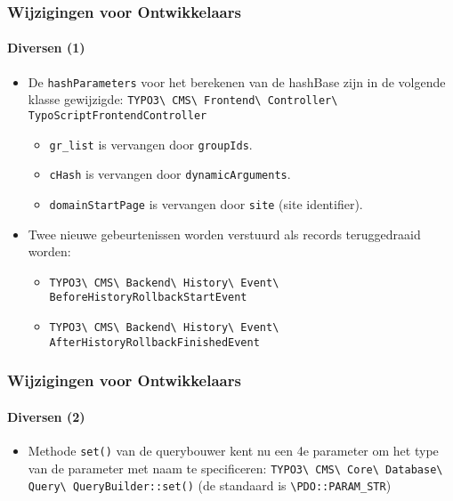 \begin{frame}[fragile]
	\frametitle{Wijzigingen voor Ontwikkelaars}
	\framesubtitle{Diversen (1)}

	\begin{itemize}
		\item De \texttt{hashParameters} voor het berekenen van de hashBase zijn in de volgende klasse gewijzigde:\newline
			\small
				\texttt{TYPO3\textbackslash
					CMS\textbackslash
					Frontend\textbackslash
					Controller\textbackslash
					TypoScriptFrontendController}
			\normalsize

			\begin{itemize}
				\item \texttt{gr\_list} is vervangen door \texttt{groupIds}.
				\item \texttt{cHash} is vervangen door \texttt{dynamicArguments}.
				\item \texttt{domainStartPage} is vervangen door \texttt{site} (site identifier).
			\end{itemize}

		\item Twee nieuwe gebeurtenissen worden verstuurd als records teruggedraaid worden:

			\begin{itemize}\smaller
				\item \texttt{TYPO3\textbackslash
					CMS\textbackslash
					Backend\textbackslash
					History\textbackslash
					Event\textbackslash
					BeforeHistoryRollbackStartEvent}
				\item \texttt{TYPO3\textbackslash
					CMS\textbackslash
					Backend\textbackslash
					History\textbackslash
					Event\textbackslash
					AfterHistoryRollbackFinishedEvent}
			\end{itemize}\normalsize

	\end{itemize}

\end{frame}


\begin{frame}[fragile]
	\frametitle{Wijzigingen voor Ontwikkelaars}
	\framesubtitle{Diversen (2)}

	\begin{itemize}
		\item Methode \texttt{set()} van de querybouwer kent nu een 4e parameter
			om het type van de parameter met naam te specificeren:\newline
			\small
				\texttt{TYPO3\textbackslash
					CMS\textbackslash
					Core\textbackslash
					Database\textbackslash
					Query\textbackslash
					QueryBuilder::set()}
			\normalsize\newline
			\vspace{0.2cm}
			(de standaard is \texttt{\textbackslash PDO::PARAM\_STR})

	\end{itemize}

\end{frame}

